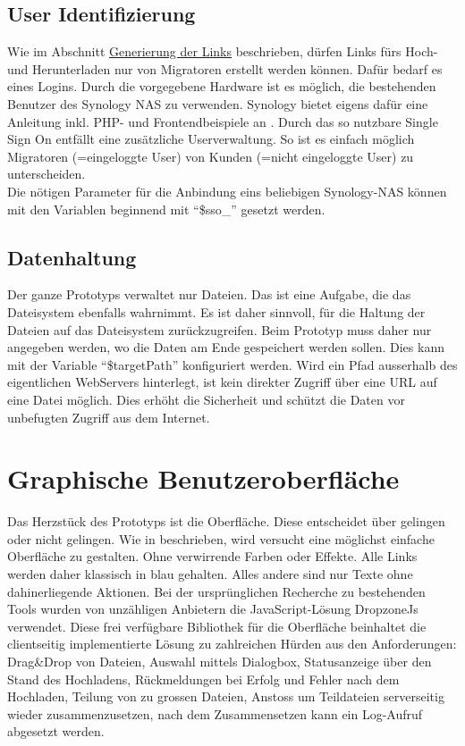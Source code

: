 \subsection{User Identifizierung}
Wie im Abschnitt \hyperref[subsec:Links]{Generierung der Links} beschrieben, dürfen Links fürs Hoch- und Herunterladen nur 
von Migratoren erstellt werden können. Dafür bedarf es eines Logins. Durch die vorgegebene Hardware ist es möglich, 
die bestehenden Benutzer des Synology NAS zu verwenden. Synology bietet eigens dafür eine Anleitung inkl. PHP- und Frontendbeispiele an \cite{Synology}.
Durch das so nutzbare Single Sign On entfällt eine zusätzliche Userverwaltung. 
So ist es einfach möglich Migratoren (=eingeloggte User) von Kunden (=nicht eingeloggte User) zu unterscheiden.
\\ 
Die nötigen Parameter für die Anbindung eins beliebigen Synology-NAS können mit den Variablen beginnend mit ``\$sso\_'' gesetzt werden.

\subsection{Datenhaltung}
Der ganze Prototyps verwaltet nur Dateien. Das ist eine Aufgabe, die das Dateisystem ebenfalls wahrnimmt.
Es ist daher sinnvoll, für die Haltung der Dateien auf das Dateisystem zurückzugreifen. 
Beim Prototyp muss daher nur angegeben werden, wo die Daten am Ende gespeichert werden sollen. 
Dies kann mit der Variable ``\$targetPath'' konfiguriert werden. 
Wird ein Pfad ausserhalb des eigentlichen WebServers hinterlegt, ist kein direkter Zugriff über eine URL auf eine Datei möglich.
Dies erhöht die Sicherheit und schützt die Daten vor unbefugten Zugriff aus dem Internet.

\section{Graphische Benutzeroberfläche}
Das Herzstück des Prototyps ist die Oberfläche. Diese entscheidet über gelingen oder nicht gelingen.
Wie in \cite{Butz} beschrieben, wird versucht eine möglichst einfache Oberfläche zu gestalten. Ohne verwirrende Farben oder Effekte.
Alle Links werden daher klassisch in blau gehalten. Alles andere sind nur Texte ohne dahinerliegende Aktionen.
Bei der ursprünglichen Recherche zu bestehenden Tools wurden von unzähligen Anbietern die JavaScript-Lösung DropzoneJs verwendet.
Diese frei verfügbare Bibliothek für die Oberfläche beinhaltet die clientseitig implementierte Lösung zu zahlreichen Hürden aus den Anforderungen:
Drag\&Drop von Dateien, 
Auswahl mittels Dialogbox, 
Statusanzeige über den Stand des Hochladens,
Rückmeldungen bei Erfolg und Fehler nach dem Hochladen,
Teilung von zu grossen Dateien, 
Anstoss um Teildateien serverseitig wieder zusammenzusetzen,
nach dem Zusammensetzen kann ein Log-Aufruf abgesetzt werden.

